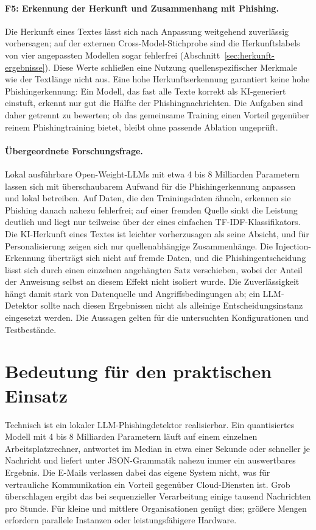 \documentclass[12pt,twoside=false,a4paper,parskip]{scrbook}
\begin{document}
\paragraph{F5: Erkennung der Herkunft und Zusammenhang mit Phishing.}
Die Herkunft eines Textes lässt sich nach Anpassung weitgehend zuverlässig vorhersagen; auf der externen Cross-Model-Stichprobe sind die Herkunftslabels von vier angepassten Modellen sogar fehlerfrei (Abschnitt~\ref{sec:herkunft-ergebnisse}). Diese Werte schließen eine Nutzung quellenspezifischer Merkmale wie der Textlänge nicht aus. Eine hohe Herkunftserkennung garantiert keine hohe Phishingerkennung: Ein Modell, das fast alle Texte korrekt als KI-generiert einstuft, erkennt nur gut die Hälfte der Phishingnachrichten. Die Aufgaben sind daher getrennt zu bewerten; ob das gemeinsame Training einen Vorteil gegenüber reinem Phishingtraining bietet, bleibt ohne passende Ablation ungeprüft.

\paragraph{Übergeordnete Forschungsfrage.}
Lokal ausführbare Open-Weight-LLMs mit etwa 4 bis 8 Milliarden Parametern lassen sich mit überschaubarem Aufwand für die Phishingerkennung anpassen und lokal betreiben. Auf Daten, die den Trainingsdaten ähneln, erkennen sie Phishing danach nahezu fehlerfrei; auf einer fremden Quelle sinkt die Leistung deutlich und liegt nur teilweise über der eines einfachen TF-IDF-Klassifikators. Die KI-Herkunft eines Textes ist leichter vorherzusagen als seine Absicht, und für Personalisierung zeigen sich nur quellenabhängige Zusammenhänge. Die Injection-Erkennung überträgt sich nicht auf fremde Daten, und die Phishingentscheidung lässt sich durch einen einzelnen angehängten Satz verschieben, wobei der Anteil der Anweisung selbst an diesem Effekt nicht isoliert wurde. Die Zuverlässigkeit hängt damit stark von Datenquelle und Angriffsbedingungen ab; ein LLM-Detektor sollte nach diesen Ergebnissen nicht als alleinige Entscheidungsinstanz eingesetzt werden. Die Aussagen gelten für die untersuchten Konfigurationen und Testbestände.

\section{Bedeutung für den praktischen Einsatz}\label{sec:praxis}

Technisch ist ein lokaler LLM-Phishingdetektor realisierbar. Ein quantisiertes Modell mit 4 bis 8 Milliarden Parametern läuft auf einem einzelnen Arbeitsplatzrechner, antwortet im Median in etwa einer Sekunde oder schneller je Nachricht und liefert unter JSON-Grammatik nahezu immer ein auswertbares Ergebnis. Die E-Mails verlassen dabei das eigene System nicht, was für vertrauliche Kommunikation ein Vorteil gegenüber Cloud-Diensten ist. Grob überschlagen ergibt das bei sequenzieller Verarbeitung einige tausend Nachrichten pro Stunde. Für kleine und mittlere Organisationen genügt dies; größere Mengen erfordern parallele Instanzen oder leistungsfähigere Hardware.
\end{document}
